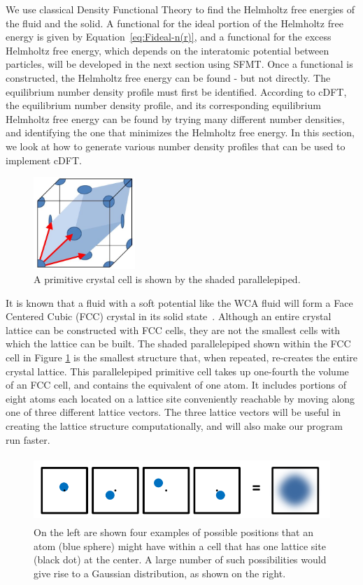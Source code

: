 \documentclass[double,12pt]{beavtex}
\begin{document}
We use classical Density Functional Theory 
to find the Helmholtz free energies of the fluid and the solid. 
A functional for the ideal portion of the
Helmholtz free energy is given by Equation~\ref{eq:Fideal-n(r)}, and a 
functional for 
the excess Helmholtz free energy, which depends on the interatomic potential
between particles, will be developed in the next section using SFMT. 
Once a functional is constructed, the Helmholtz free energy can be found - 
but not directly. The equilibrium number density profile must first be 
identified. According to cDFT, the equilibrium number density profile, 
and its corresponding equilibrium Helmholtz free energy can be found 
by trying many different number densities, and identifying the one that 
minimizes the Helmholtz free energy. In this section, we look at how to 
generate various number density profiles that can be used to implement cDFT. 

\begin{figure}
  \centering
  \includegraphics[height=3.5cm]{PrimitiveCellLightBlue.png}
  \caption{A primitive crystal cell is shown by the shaded parallelepiped.}
  \label{fig:primitivecell}
\end{figure}

It is known that a fluid with a soft potential like the WCA fluid will 
form a Face Centered Cubic (FCC) crystal in its solid state~\cite{Hansen}. 
Although an entire 
crystal lattice can be constructed with FCC cells, 
they are not the smallest cells with which the lattice can be built. 
The shaded parallelepiped shown within the FCC cell in Figure \ref{fig:primitivecell} 
is the smallest structure that, when repeated, re-creates the entire crystal 
lattice. This parallelepiped primitive cell takes up one-fourth the volume 
of an FCC cell, and contains the equivalent of one atom.
It includes portions of eight atoms each located on a lattice site conveniently 
reachable by moving along one of three different lattice vectors. 
The three lattice vectors will be useful in 
creating the lattice structure computationally, and will also make our 
program run faster.

\begin{figure}
  \centering
  \includegraphics[height=2.5cm]{Ensemble_Gaussian.png}
  \caption{On the left are shown four examples of possible positions 
  that an atom (blue sphere) might have within a cell that has one 
  lattice site (black dot) at the center. A large number of such 
  possibilities would give rise to a Gaussian distribution, 
  as shown on the right.}
  \label{fig:Ensemble_Gaus}
\end{figure} 
\end{document}
